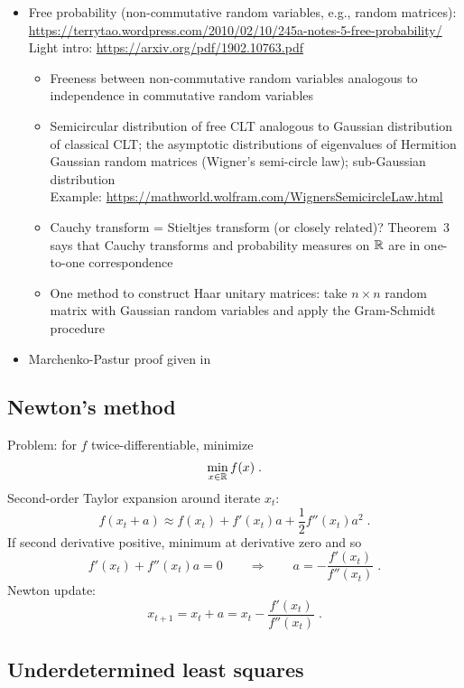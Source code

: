 \documentclass[10pt]{article}
\begin{document}
\begin{itemize}
\item
Free probability (non-commutative random variables, e.g., random matrices): \\
\url{https://terrytao.wordpress.com/2010/02/10/245a-notes-5-free-probability/} \\
Light intro: \url{https://arxiv.org/pdf/1902.10763.pdf} \citep{Xia:2019}
\begin{itemize}
\item
Freeness between non-commutative random variables analogous to independence in commutative random variables
\item
Semicircular distribution of free CLT analogous to Gaussian distribution of classical CLT; the asymptotic distributions of eigenvalues of Hermition Gaussian random matrices (Wigner's semi-circle law); sub-Gaussian distribution \\
Example: \url{https://mathworld.wolfram.com/WignersSemicircleLaw.html}
\item
Cauchy transform = Stieltjes transform (or closely related)? Theorem~3 says that Cauchy transforms and probability measures on $\mathbb{R}$ are in one-to-one correspondence
\item
One method to construct Haar unitary matrices: take $n\times n$ random matrix with \iid Gaussian random variables and apply the Gram-Schmidt procedure
\end{itemize}

\item
Marchenko-Pastur proof given in \citep{Couillet:2011}

\end{itemize}


\subsection{Newton's method}

Problem: for $f$ twice-differentiable, minimize
\[
\min_{x\in\mathbb{R}} f(x) \;.
\]
Second-order Taylor expansion around iterate $x_t$:
\[
f(x_t+a) \approx f(x_t) + f'(x_t)a + \frac{1}{2}f''(x_t)a^2 \;.
\]
If second derivative positive, minimum at derivative zero and so
\[
f'(x_t) + f''(x_t)a = 0 \qquad \Rightarrow\qquad a = -\frac{f'(x_t)}{f''(x_t)} \;.
\]
Newton update:
\[
x_{t+1} = x_t +a = x_t - \frac{f'(x_t)}{f''(x_t)} \;.
\]


\subsection{Underdetermined least squares}
\end{document}

